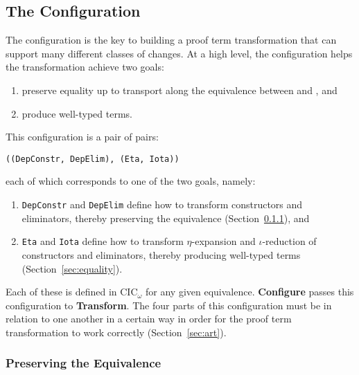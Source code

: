 \subsection{The Configuration}
\label{sec:configurable}

The configuration is the key to building a proof term transformation that can support many different classes of changes.
At a high level, the configuration helps the transformation achieve two goals:

\begin{enumerate}
\item preserve equality up to transport along the equivalence between \A and \B, and
\item produce well-typed terms.
\end{enumerate}
This configuration is a pair of pairs:

\begin{lstlisting}
((DepConstr, DepElim), (Eta, Iota))
\end{lstlisting}
each of which corresponds to one of the two goals, namely:

\begin{enumerate}
\item \lstinline{DepConstr} and \lstinline{DepElim} define how to transform constructors and eliminators, thereby preserving the equivalence (Section~\ref{sec:equivalence}), and 
\item \lstinline{Eta} and \lstinline{Iota} define how to transform $\eta$-expansion and $\iota$-reduction of constructors and eliminators, thereby producing well-typed terms (Section~\ref{sec:equality}).
\end{enumerate}
Each of these is defined in CIC$_{\omega}$ for any given equivalence.
\textbf{Configure} passes this configuration to \textbf{Transform}.
The four parts of this configuration must be in relation to one another in a certain way in order for the proof
term transformation to work correctly (Section~\ref{sec:art}).

\subsubsection{Preserving the Equivalence}
\label{sec:equivalence}

